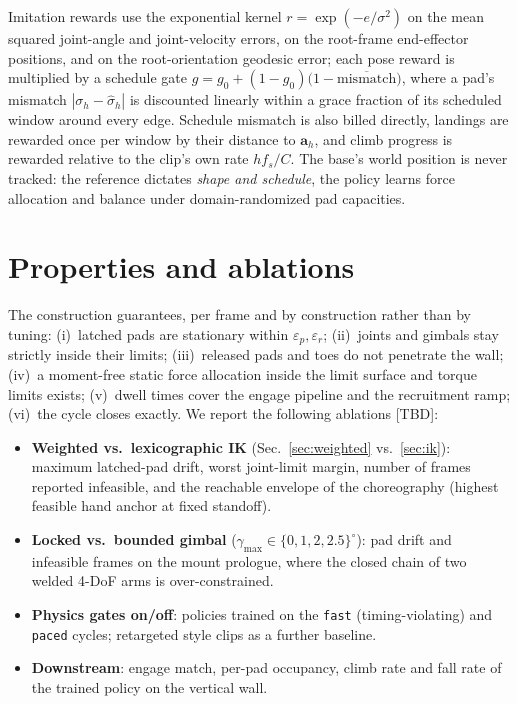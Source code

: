 \documentclass[11pt]{article}
\newcommand{\tbd}{{\color{red}[TBD]}}
\begin{document}
Imitation rewards use the exponential kernel $r=\exp(-e/\sigma^2)$ on the
mean squared joint-angle and joint-velocity errors, on the root-frame
end-effector positions, and on the root-orientation geodesic error; each pose
reward is multiplied by a schedule gate
$g=g_0+(1-g_0)\bigl(1-\overline{\mathrm{mismatch}}\bigr)$, where a pad's
mismatch $|\sigma_h-\hat\sigma_h|$ is discounted linearly within a grace
fraction of its scheduled window around every edge. Schedule mismatch is
also billed directly, landings are rewarded once per window by their
distance to $\bm a_h$, and climb progress is rewarded relative to the clip's
own rate $h f_s/C$. The base's world position is never tracked: the
reference dictates \emph{shape and schedule}, the policy learns force
allocation and balance under domain-randomized pad capacities.

\section{Properties and ablations}
\label{sec:ablation}

The construction guarantees, per frame and by construction rather than by
tuning: (i)~latched pads are stationary within $\varepsilon_p,\varepsilon_r$;
(ii)~joints and gimbals stay strictly inside their limits; (iii)~released
pads and toes do not penetrate the wall; (iv)~a moment-free static force
allocation inside the limit surface and torque limits exists; (v)~dwell
times cover the engage pipeline and the recruitment ramp; (vi)~the cycle
closes exactly. We report the following ablations \tbd:

\begin{itemize}[leftmargin=1.6em]
  \item \textbf{Weighted vs.\ lexicographic IK} (Sec.~\ref{sec:weighted} vs.\
        \ref{sec:ik}): maximum latched-pad drift, worst joint-limit margin,
        number of frames reported infeasible, and the reachable envelope of
        the choreography (highest feasible hand anchor at fixed standoff).
  \item \textbf{Locked vs.\ bounded gimbal} ($\gamma_{\max}\in\{0,1,2,2.5\}^\circ$):
        pad drift and infeasible frames on the mount prologue, where the
        closed chain of two welded 4-DoF arms is over-constrained.
  \item \textbf{Physics gates on/off}: policies trained on the \texttt{fast}
        (timing-violating) and \texttt{paced} cycles; retargeted style clips
        as a further baseline.
  \item \textbf{Downstream}: engage match, per-pad occupancy, climb rate and
        fall rate of the trained policy on the vertical wall.
\end{itemize}
\end{document}
